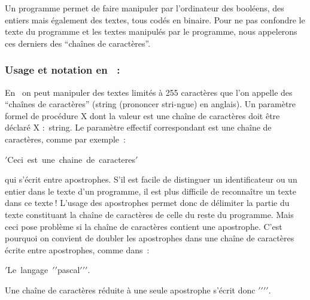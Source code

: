 Un programme permet de faire manipuler par l'ordinateur des booléens, des entiers mais
également des textes, tous codés en binaire. Pour ne pas confondre le texte du programme
et les textes manipulés par le programme, nous appelerons ces derniers des ``chaînes de 
caractères''.

\subsubsection{Usage et notation en \protect\pascal~:}
En \pascal\ on peut manipuler des textes limités à 255 caractères que l'on appelle des
``chaînes de caractères'' ({\idt string} (prononcer stri-ngue) en anglais). Un paramètre
formel de procédure {\idt X} dont la valeur est une chaîne de ca\-rac\-tè\-res doit être
déclaré {\idt X $:$ string}. Le paramètre effectif correspondant est une chaîne de
caractères, comme par exemple~:
\begin{center}
{\cha $\scriptstyle '$Ceci\ est\ une\ chaine\ de\ caracteres\idt $\scriptstyle '$}
\end{center}
qui s'écrit entre apostrophes. S'il est facile de distinguer un identificateur ou un entier dans le texte d'un
programme, il est plus difficile de reconnaître un texte dans ce texte$\:$! L'usage des apostrophes permet donc de 
délimiter la partie du texte constituant la chaîne de caractères de celle du reste du programme. Mais ceci pose
problème si la chaîne de caractères contient une apostrophe. C'est pourquoi on convient de doubler les apostrophes
dans une chaîne de caractères écrite entre apostrophes, 
comme dans~:
\begin{center}
{\cha $\scriptstyle '$Le\ langage\ \idt $\scriptstyle '$\cha $\scriptstyle '$pascal\idt $\scriptstyle '$\cha $\scriptstyle '$\idt $\scriptstyle '$}.
\end{center}
Une chaîne de caractères réduite à une seule apostrophe s'écrit donc
{\cha $\scriptstyle '$\idt $\scriptstyle '$\cha $\scriptstyle '$\idt $\scriptstyle '$}.

